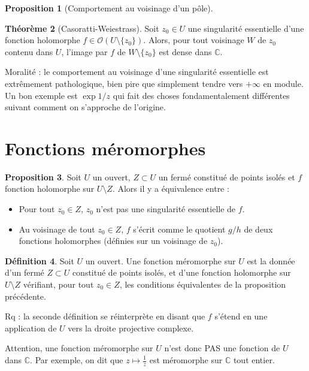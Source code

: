 \documentclass[11pt,a4paper]{book}
\newcommand{\C}{\mathbb{C}}
\theoremstyle{definition}
\newtheorem{theoreme}{Th\'eor\`eme}[section]
\newtheorem{proposition}[theoreme]{Proposition}
\newtheorem{definition}[theoreme]{D\'efinition}
\theoremstyle{plain}
\begin{document}
\begin{proposition}[Comportement au voisinage d'un pôle]
\end{proposition}

\begin{theoreme}[Casoratti-Weiestrass]
Soit $z_0 \in U$ une singularité essentielle d'une fonction holomorphe $f \in \mathcal O(U\setminus \{z_0\})$.
Alors, pour tout voisinage $W$ de $z_0$ contenu dans $U$, l'image par $f$ de $W\setminus\{z_0\}$ est dense dans $\C$.
\end{theoreme}

Moralité : le comportement au voisinage d'une singularité essentielle est extrêmement pathologique, bien pire que simplement tendre vers $+\infty$ en module. Un bon exemple est $\exp{1/z}$ qui fait des choses fondamentalement différentes suivant comment on s'approche de l'origine.

\section{Fonctions méromorphes}

\begin{proposition}
Soit $U$ un ouvert,  $Z\subset U$ un fermé constitué de points isolés et $f$ fonction holomorphe sur $U\setminus Z$.
Alors il y a équivalence entre :
\begin{itemize}
\item Pour tout $z_0\in Z$, $z_0$ n'est pas une singularité essentielle de $f$.
\item Au voisinage de tout $z_0\in Z$, $f$ s'écrit comme le quotient $g/h$ de deux fonctions holomorphes (définies sur un voisinage de $z_0$).
\end{itemize}
\end{proposition}

\begin{definition}
Soit $U$ un ouvert.
Une fonction méromorphe sur $U$ est la donnée d'un fermé $Z\subset U$ constitué de points isolés, et d'une fonction holomorphe sur $U\setminus Z$ vérifiant, pour tout $z_0\in Z$, les conditions équivalentes de la proposition précédente.
\end{definition}

Rq : la seconde définition se réinterprète en disant que $f$ s'étend en une application  de $U$ vers la droite projective complexe.


Attention, une \og fonction méromorphe sur $U$\fg{} n'est donc PAS une fonction de $U$ dans $\C$. Par exemple, on dit que $z\mapsto \frac{1}{z}$ est méromorphe sur $\C$ tout entier.
\end{document}
